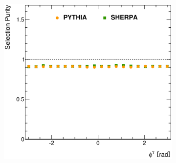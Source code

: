 \documentclass[12pt, twoside]{article}
\numberwithin{equation}{section}
\numberwithin{figure}{section}
\newenvironment{changemargin}[2]{%
\begin{list}{}{%
\setlength{\topsep}{0pt}%
\setlength{\leftmargin}{#1}%
\setlength{\rightmargin}{#2}%
\setlength{\listparindent}{\parindent}%
\setlength{\itemindent}{\parindent}%
\setlength{\parsep}{\parskip}%
}%
\item[]}{\end{list}}
\begin{document}
\begin{figure}
\begin{changemargin}{-1.0cm}{-0.75cm}
\begin{changemargin}{-0.75cm}{-1.0cm}
\begin{subfigure}[b]{0.37\textwidth}
            \subcaption{}
            \label{fig:SelectionPuritiesEtaPhoton}
        \end{subfigure}
        \begin{subfigure}[b]{0.37\textwidth}
            \includegraphics[width=\textwidth]{./images/SelectionPurities/PUR-103.eps}
            \subcaption{}
            \label{fig:SelectionPuritiesPhiPhoton}
        \end{subfigure}


\end{changemargin}
\end{changemargin}
\end{figure}
\end{document}
